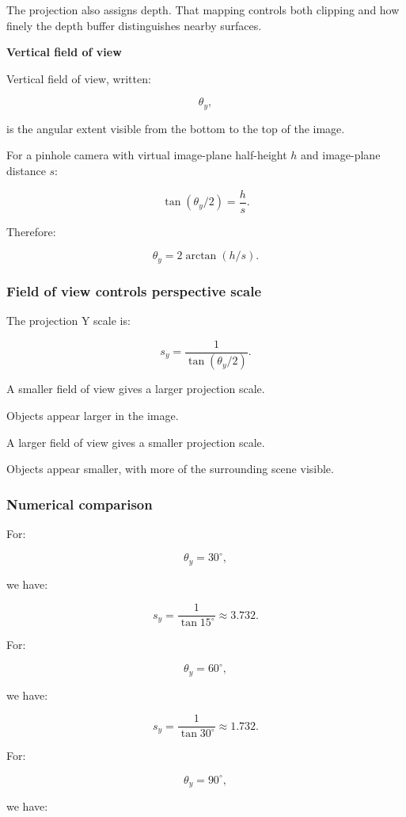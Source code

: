 The projection also assigns depth. That mapping controls both clipping and how finely the depth buffer distinguishes nearby surfaces.

\textbf{Vertical field of view}

Vertical field of view, written:

\[
 \boxed{\theta_y},
\]

is the angular extent visible from the bottom to the top of the image.

For a pinhole camera with virtual image-plane half-height \(h\) and image-plane distance \(s\):

\[
 \boxed{ \tan(\theta_y/2)=\frac hs }.
\]

Therefore:

\[
 \boxed{ \theta_y=2\arctan(h/s) }.
\]

\subsubsection{Field of view controls perspective scale}\label{field-of-view-controls-perspective-scale}

The projection Y scale is:

\[
 \boxed{ s_y=\frac1{\tan(\theta_y/2)} }.
\]

A smaller field of view gives a larger projection scale.

Objects appear larger in the image.

A larger field of view gives a smaller projection scale.

Objects appear smaller, with more of the surrounding scene visible.

\subsubsection{Numerical comparison}\label{numerical-comparison}

For:

\[
 \theta_y=30^\circ,
\]

we have:

\[
 s_y=\frac1{\tan15^\circ}\approx3.732.
\]

For:

\[
 \theta_y=60^\circ,
\]

we have:

\[
 s_y=\frac1{\tan30^\circ}\approx1.732.
\]

For:

\[
 \theta_y=90^\circ,
\]

we have:

